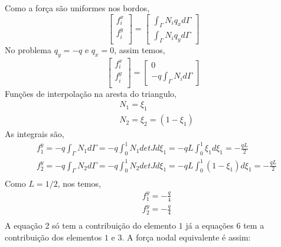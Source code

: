 %
Como a força são uniformes nos bordos,
%
\begin{equation}
	\begin{bmatrix}
		f^x_i\\
		f^y_i\\
	\end{bmatrix}
	=
	\begin{bmatrix}
		\int_{\Gamma} N_i q_x d\Gamma\\
		\int_{\Gamma} N_i q_y d\Gamma
	\end{bmatrix}
\end{equation}
%
No problema $q_y = -q$ e $q_x = 0$, assim temos,
%
\begin{equation}
	\begin{bmatrix}
		f^x_i\\
		f^y_i\\
	\end{bmatrix}
	=
	\begin{bmatrix}
		0\\
		-q \int_{\Gamma} N_i d\Gamma
	\end{bmatrix}
\end{equation}
%
Funções de interpolação na aresta do triangulo,
%
\begin{equation}
	\begin{split}
		&N_1 = \xi_1 \\ 
		&N_2 = \xi_2 = (1 - \xi_1)
	\end{split}  
\end{equation}
%
As integrais são,
\begin{equation}
	\begin{split}
		&f_1^y = -q \int_{\Gamma} N_1 d\Gamma = -q \int_{0}^{1} N_1 det J d\xi_1 = -q L \int_{0}^{1} \xi_1 d\xi_1 = -\frac{q L}{2}\\
		&f_2^y = -q \int_{\Gamma} N_2 d\Gamma = -q \int_{0}^{1} N_2 det J d\xi_1 = -q L \int_{0}^{1} (1 - \xi_1) d\xi_1 =  -\frac{q L}{2}\\
	\end{split}
\end{equation}
%
Como $L = 1/2$, nos temos,
%
\begin{equation}
	\begin{split}
		&f_1^y = -\frac{q}{4}\\
		&f_2^y = -\frac{q}{4}\\
	\end{split}
\end{equation}
%
A equação 2 só tem a contribuição do elemento $1$ já a equações 6 tem a contribuição dos elementos $1$ e $3$. A força nodal equivalente é assim:

